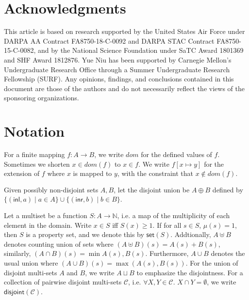 \documentclass{easychair}
\newcommand{\ms}[1]{\ensuremath{\mathsf{#1}}}
\newcommand{\dist}[1]{\mathsf{disjoint}(#1)}
\theoremstyle{definition}
\begin{document}
\section*{Acknowledgments}

This article is based on research supported by the United States Air
Force under DARPA AA Contract FA8750-18-C-0092 and DARPA STAC Contract
FA8750-15-C-0082, and by the National Science Foundation under SaTC
Award 1801369 and SHF Award 1812876.
%
Yue Niu has been supported by Carnegie Mellon's Undergraduate Research
Office through a Summer Undergraduate Research Fellowship (SURF).
%
Any opinions, findings, and conclusions contained in this document are
those of the authors and do not necessarily reflect the views of the
sponsoring organizations.




\label{sect:bib}

%
%
%



\appendix\label{sect:appendix}

\section{Notation}
\label{sect:notation}
For a finite mapping $f : A \to B$, we write $dom$ for the defined values of $f$. Sometimes we shorten $x \in dom(f)$ to $x \in f$. We write $f[x \mapsto y]$ for the extension of $f$ where $x$ is mapped to $y$, with the constraint that $x \notin dom(f)$. 

Given possibly non-disjoint sets $A,B$, let the disjoint union be $A \oplus B$ defined by 
$\{(\ms{inl},a) \mid a \in A\} \cup \{(\ms{inr},b) \mid b \in B\}$.

Let a multiset be a function $S : A \to \mathbb{N}$, i.e. a map of the multiplicity of each element in the domain.  Write $x \in S$ iff $S(x) \ge 1$. If for all  $s \in S$, $\mu(s) = 1$, then $S$ 
is a property set, and we denote this by $\ms{set}(S)$. Addtionally, $A \uplus B$ denotes 
counting union of sets where $(A \uplus B) (s) = A (s) + B(s)$, similarly, 
$(A \cap B)(s) = \min{A(s),B(s)}$. Furthermore, $A \cup B$ denotes the usual union where 
$(A \cup B)(s) = \max{(A(s),B(s))}$.  For the union of disjoint multi-sets $A$ and $B$, 
we write $A \sqcup B$ to emphasize the disjointness.  For a collection of pairwise disjoint 
multi-sets $\mathcal{C}$, i.e. $\forall X,Y \in \mathcal{C}$. $X \cap Y = \emptyset$, we write $\dist{\mathcal{C}}$.
\end{document}
